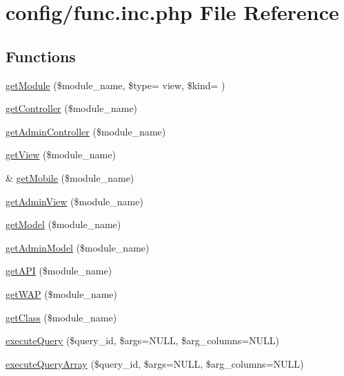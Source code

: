 \hypertarget{func_8inc_8php}{}\section{config/func.inc.\+php File Reference}
\label{func_8inc_8php}
\subsection*{Functions}
\begin{DoxyCompactItemize}
\item 
\hyperlink{func_8inc_8php_ad4f68c32ca6c16b3a8619ac3462dc686}{get\+Module} (\$module\+\_\+name, \$type= \textquotesingle{}view\textquotesingle{}, \$kind= \textquotesingle{}\textquotesingle{})
\item 
\hyperlink{func_8inc_8php_aa08f01e3bf130d770b373ca8493e3e9b}{get\+Controller} (\$module\+\_\+name)
\item 
\hyperlink{func_8inc_8php_a2f7ca88a5226536aca3b2f5682bd7b2d}{get\+Admin\+Controller} (\$module\+\_\+name)
\item 
\hyperlink{func_8inc_8php_a49d537fc2c7b51ab5d7b7c6672b21ce3}{get\+View} (\$module\+\_\+name)
\item 
\& \hyperlink{func_8inc_8php_a26d3f423593da53eb90bb738aeed23ea}{get\+Mobile} (\$module\+\_\+name)
\item 
\hyperlink{func_8inc_8php_a194629ccc05f325c64834925b05d0941}{get\+Admin\+View} (\$module\+\_\+name)
\item 
\hyperlink{func_8inc_8php_aecdfcc5332bcf22df01fc21a03b64435}{get\+Model} (\$module\+\_\+name)
\item 
\hyperlink{func_8inc_8php_a902cd0c884e75afab2682fdd3ae3791f}{get\+Admin\+Model} (\$module\+\_\+name)
\item 
\hyperlink{func_8inc_8php_a12c822fc3e002eb1c58c58001db7ac88}{get\+A\+PI} (\$module\+\_\+name)
\item 
\hyperlink{func_8inc_8php_a0d8de97888953b480d02a9c9d845a64c}{get\+W\+AP} (\$module\+\_\+name)
\item 
\hyperlink{func_8inc_8php_a1d90f6abc9ca2d1a4500071159ebd4e7}{get\+Class} (\$module\+\_\+name)
\item 
\hyperlink{func_8inc_8php_a418bc23855eebc0d90190dd625ac4474}{execute\+Query} (\$query\+\_\+id, \$args=N\+U\+LL, \$arg\+\_\+columns=N\+U\+LL)
\item 
\hyperlink{func_8inc_8php_ace5cc06ee6c5d655a1bdcc15846a779e}{execute\+Query\+Array} (\$query\+\_\+id, \$args=N\+U\+LL, \$arg\+\_\+columns=N\+U\+LL)

\end{DoxyCompactItemize}
